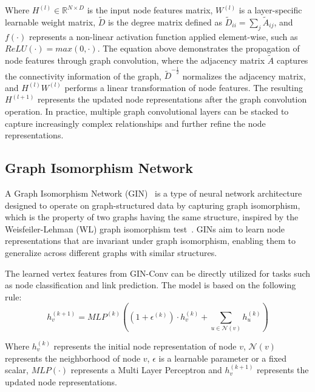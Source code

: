 Where $H^{(l)} \in \mathbb{R}^{N \times D}$ is the input node features matrix, $W^{(l)}$ is a layer-specific learnable weight matrix, $\tilde{D}$ is the degree matrix defined as $\tilde{D}_{ii} = \sum_{j} \tilde{A}_{ij}$, and $f(\cdot)$ represents a non-linear activation function applied element-wise, such as $ReLU(\cdot) = max(0, \cdot)$.
The equation above demonstrates the propagation of node features through graph convolution, where the adjacency matrix $\tilde{A}$ captures the connectivity information of the graph, $\tilde{D}^{-\tfrac{1}{2}}$ normalizes the adjacency matrix, and $H^{(l)}  W^{(l)}$ performs a linear transformation of node features.
The resulting $H^{(l+1)}$ represents the updated node representations after the graph convolution operation.
In practice, multiple graph convolutional layers can be stacked to capture increasingly complex relationships and further refine the node representations.

\subsection{Graph Isomorphism Network}
\label{subsec:graph_isomorphism_network}%

A Graph Isomorphism Network (GIN)~\cite{xu2019powerful, daigavane2021understanding} is a type of neural network architecture designed to operate on graph-structured data by capturing graph isomorphism, which is the property of two graphs having the same structure, inspired by the Weisfeiler-Lehman (WL) graph isomorphism test~\cite{xu2019powerful}.
GINs aim to learn node representations that are invariant under graph isomorphism, enabling them to generalize across different graphs with similar structures.

The learned vertex features from GIN-Conv can be directly utilized for tasks such as node classification and link prediction.
The model is based on the following rule:
\begin{equation}
    \label{eq:gin_function}
    h_v^{(k+1)} = MLP^{(k)} \left( \left( 1 + \epsilon^{(k)} \right) \cdot h_v^{(k)} + \sum_{u \in \mathcal{N}(v)} h_u^{(k)} \right)
\end{equation}

Where $h_v^{(k)}$ represents the initial node representation of node $v$, $\mathcal{N}(v)$ represents the neighborhood of node $v$, $\epsilon$ is a learnable
parameter or a fixed scalar, $MLP( \cdot )$ represents a Multi Layer Perceptron and $h_v^{(k+1)}$ represents the updated node representations.

